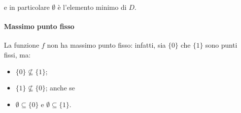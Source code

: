 e in particolare $\emptyset$ è l'elemento minimo di $D$.

\paragraph{Massimo punto fisso}
La funzione $f$ non ha massimo punto fisso: infatti, sia $\{0\}$ che $\{1\}$
sono punti fissi, ma:
\begin{itemize}
  \item $\{0\} \not\subseteq \{1\}$;
  \item $\{1\} \not\subseteq \{0\}$; anche se
  \item $\emptyset \subseteq \{0\}$ e $\emptyset \subseteq \{1\}$.
\end{itemize}

\let\lt\undefined
